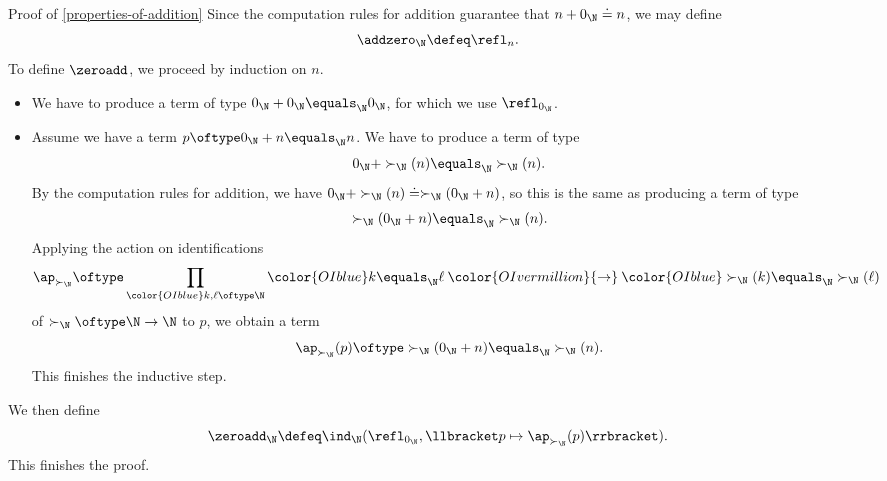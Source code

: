 \begin{Proof}{Proof of \cref{properties-of-addition}}%
    Since the computation rules for addition guarantee that $n+0_{\N}\doteq n$, we may define
    \[
        \addzero_{\N}%
        \defeq%
        \refl_{n}.%
    \]%
    To define $\zeroadd$, we proceed by induction on $n$.
    \begin{itemize}
        \item{}We have to produce a term of type $0_{\N}+0_{\N}\equals_{\N}0_{\N}$, for which we use $\refl_{0_{\N}}$.
        \item{}Assume we have a term $p\oftype 0_{\N}+n\equals_{\N}n$. We have to produce a term of type
            \[
                0_{\N}+\succ_{\N}(n)%
                \equals_{\N}%
                \succ_{\N}(n).%
            \]%
            By the computation rules for addition, we have $0_{\N}+\succ_{\N}(n)\doteq\succ_{\N}(0_{\N}+n)$, so this is the same as producing a term of type
            \[
                \succ_{\N}(0_{\N}+n)%
                \equals_{\N}%
                \succ_{\N}(n).%
            \]%
            Applying the action on identifications
            \[
                \ap_{\succ_{\N}}%
                \oftype%
                \prod_{{\color{OIblue}k,\ell\oftype\N}}{\color{OIblue}k\equals_{\N}\ell}\mathbin{\color{OIvermillion}{\to}}{\color{OIblue}\succ_{\N}(k)\equals_{\N}\succ_{\N}(\ell)}%
            \]%
            of $\succ_{\N}\oftype\N\to\N$ to $p$, we obtain a term
            \[
                \ap_{\succ_{\N}}(p)%
                \oftype%
                \succ_{\N}(0_{\N}+n)%
                \equals_{\N}%
                \succ_{\N}(n).%
            \]%
            This finishes the inductive step.
    \end{itemize}
    We then define
    \[
        \zeroadd_{\N}%
        \defeq%
        \ind_{\N}(\refl_{0_{\N}},\llbracket p\mapsto\ap_{\succ_{\N}}(p)\rrbracket).%
    \]%
    This finishes the proof.


\end{Proof}
